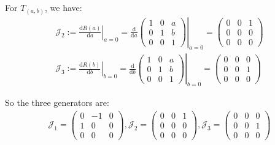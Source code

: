 \documentclass[]{ctexart}
\begin{document}
		For $ T_{(a,b)} $, we have:
			\begin{equation*}
			\begin{aligned}
			\mathcal{J}_2:=\left.\frac{\mathrm{d} R(a)}{\mathrm{d} a}\right|_{a=0}=\left.\frac{\mathrm{d}}{\mathrm{d} a }\left(\begin{array}{ccc}
			1 & 0 & a  \\
			0 & 1 & b \\
			0 & 0 & 1
			\end{array}\right)\right|_{a=0}=\left(\begin{array}{ccc}
			0 & 0  & 1 \\
			0 & 0  & 0 \\
			0 & 0  & 0
			\end{array}\right)\\
			\mathcal{J}_3:=\left.\frac{\mathrm{d} R(b)}{\mathrm{d} b}\right|_{b=0}=\left.\frac{\mathrm{d}}{\mathrm{d} b }\left(\begin{array}{ccc}
			1 & 0 & a  \\
			0 & 1 & b \\
			0 & 0 & 1
			\end{array}\right)\right|_{b=0}=\left(\begin{array}{ccc}
			0 & 0  & 0 \\
			0 & 0  & 1 \\
			0 & 0  & 0
			\end{array}\right)
			\end{aligned}
			\end{equation*}
			
		So the three generators are:
			\begin{equation*}
			\begin{aligned}
				\mathcal{J}_1=
				\begin{pmatrix}
				0 & -1 & 0 \\
				1 & 0  & 0 \\
				0 & 0  & 0
				\end{pmatrix}
				,
				\mathcal{J}_2=
				\begin{pmatrix}
				0 & 0  & 1 \\
				0 & 0  & 0 \\
				0 & 0  & 0
				\end{pmatrix}
				,
				\mathcal{J}_3=
				\begin{pmatrix}
				0 & 0  & 0 \\
				0 & 0  & 1 \\
				0 & 0  & 0
				\end{pmatrix}
			\end{aligned}
			\end{equation*}
			
\end{document}
